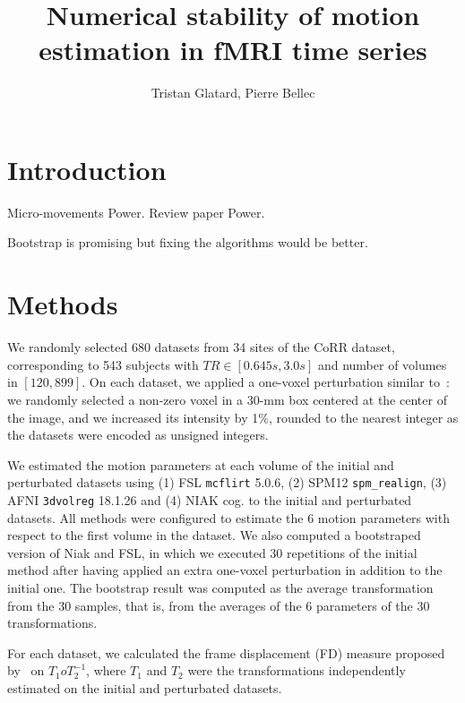 \documentclass[11pt]{article}
\title{Numerical stability of motion estimation in fMRI time series}
\author{Tristan Glatard, Pierre Bellec}
\begin{document}
\maketitle

\section{Introduction}

Micro-movements Power. Review paper Power.

Bootstrap is promising but fixing the algorithms would be better.




\section{Methods}

We randomly selected 680 datasets from 34 sites of the CoRR dataset, 
corresponding to 543 subjects with $TR \in [0.645s, 3.0s]$ and number 
of volumes in $[120, 899]$. On each dataset, we applied a one-voxel 
perturbation similar to~\cite{lindsay}: we randomly selected a non-zero 
voxel in a 30-mm box centered at the center of the image, and we 
increased its intensity by 1\%, rounded to the nearest integer as the 
datasets were encoded as unsigned integers.

We estimated the motion parameters at each volume of the initial and 
perturbated datasets using (1) FSL \texttt{mcflirt} 5.0.6, (2) SPM12 
\texttt{spm\_realign}, (3) AFNI \texttt{3dvolreg} 18.1.26 and (4) NIAK 
cog. to the initial and perturbated datasets. All methods were 
configured to estimate the 6 motion parameters with respect to the 
first volume in the dataset. We also computed a bootstraped version of 
Niak and FSL, in which we executed 30 repetitions of the initial method 
after having applied an extra one-voxel perturbation in addition to the 
initial one. The bootstrap result was computed as the average 
transformation from the 30 samples, that is, from the averages of the 6 
parameters of the 30 transformations.

For each dataset, we calculated the frame displacement (FD) measure 
proposed by~\cite{power2012spurious} on $T_1oT_2^{-1}$, where $T_1$ and $T_2$ were 
the transformations independently estimated on the initial and 
perturbated datasets.
\end{document}
